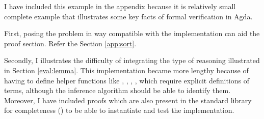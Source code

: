 \documentclass[12pt,twoside,notitlepage]{report}
\begin{document}
I have included this example in the appendix because it is relatively small complete example that illustrates some key facts of formal verification in Agda.

First, posing the problem in way compatible with the implementation can aid the proof section. Refer the Section \ref{app:sort}. 

Secondly, I illustrates the difficulty of integrating the type of reasoning illustrated in Section \ref{eval:lemma}. This implementation became more lengthy because of having to define helper functions like , , , , which require explicit definitions of terms, although the inference algorithm should be able to identify them. Moreover, I have included proofs which are also present in the standard library for completeness () to be able to instantiate and test the implementation.
 





\end{document}
